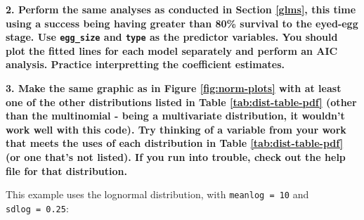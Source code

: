 \documentclass[]{book}
\newenvironment{Shaded}{\begin{snugshade}}{\end{snugshade}}
\newcommand{\KeywordTok}[1]{\textcolor[rgb]{0.13,0.29,0.53}{\textbf{#1}}}
\newcommand{\DataTypeTok}[1]{\textcolor[rgb]{0.13,0.29,0.53}{#1}}
\newcommand{\DecValTok}[1]{\textcolor[rgb]{0.00,0.00,0.81}{#1}}
\newcommand{\StringTok}[1]{\textcolor[rgb]{0.31,0.60,0.02}{#1}}
\newcommand{\OperatorTok}[1]{\textcolor[rgb]{0.81,0.36,0.00}{\textbf{#1}}}
\newcommand{\NormalTok}[1]{#1}
\theoremstyle{definition}
\theoremstyle{definition}
\theoremstyle{definition}
\theoremstyle{remark}
\begin{document}
\textbf{2. Perform the same analyses as conducted in Section \ref{glms},
this time using a success being having greater than 80\% survival to the
eyed-egg stage. Use \texttt{egg\_size} and \texttt{type} as the
predictor variables. You should plot the fitted lines for each model
separately and perform an AIC analysis. Practice interpretting the
coefficient estimates.}

\begin{Shaded}
\end{Shaded}

\textbf{3. Make the same graphic as in Figure \ref{fig:norm-plots} with
at least one of the other distributions listed in Table
\ref{tab:dist-table-pdf} (other than the multinomial - being a
multivariate distribution, it wouldn't work well with this code). Try
thinking of a variable from your work that meets the uses of each
distribution in Table \ref{tab:dist-table-pdf} (or one that's not
listed). If you run into trouble, check out the help file for that
distribution.}

This example uses the lognormal distribution, with
\texttt{meanlog\ =\ 10} and \texttt{sdlog\ =\ 0.25}:
\end{document}
